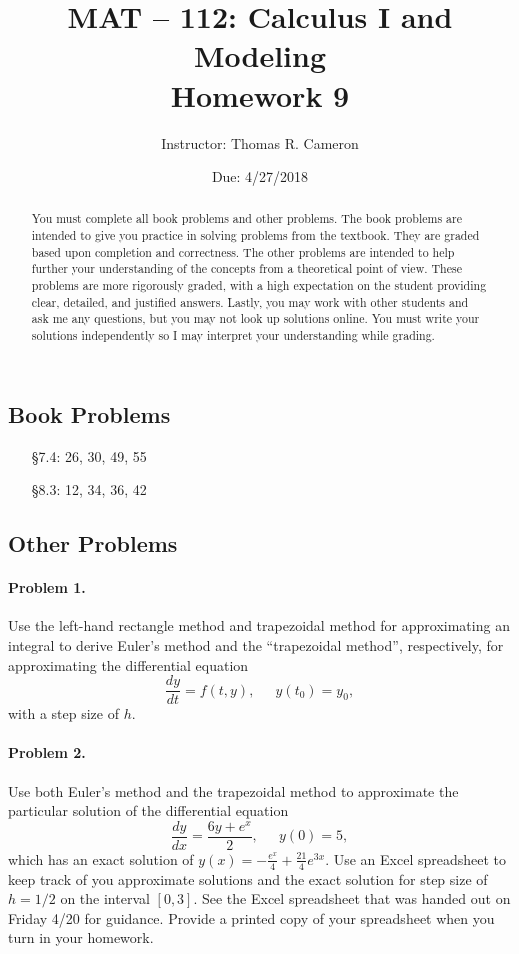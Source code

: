 \documentclass{article}
\title{MAT -- 112: Calculus I and Modeling\\
\large{Homework 9}}
\author{Instructor: Thomas R. Cameron}
\date{Due: 4/27/2018}
\begin{document}
\maketitle

\begin{abstract}
You must complete all book problems and other problems. The book problems are intended to give you practice in solving problems from the textbook. They are graded based upon completion and correctness. The other problems are intended to help further your understanding of the concepts from a theoretical point of view. These problems are more rigorously graded, with a high expectation on the student providing clear, detailed, and justified answers. Lastly, you may work with other students and ask me any questions, but you may not look up solutions online. You must write your solutions independently so I may interpret your understanding while grading. 
\end{abstract}

\subsection*{Book Problems}
\begin{itemize}
\item	  [\S 7.4:] 26, 30, 49, 55
\item	  [\S 8.3:] 12, 34, 36, 42
\end{itemize}

\subsection*{Other Problems}

\paragraph*{Problem 1.} Use the left-hand rectangle method and trapezoidal method for approximating an integral to derive Euler's method and the ``trapezoidal method'', respectively, for approximating the differential equation
\[
\frac{dy}{dt}=f(t,y),~\quad~y(t_{0})=y_{0},
\]
with a step size of $h$. 

\paragraph*{Problem 2.} Use both Euler's method and the trapezoidal method to approximate the particular solution of the differential equation
\[
\frac{dy}{dx}=\frac{6y+e^{x}}{2},~\quad~y(0)=5,
\]
which has an exact solution of $y(x)=-\frac{e^{x}}{4}+\frac{21}{4}e^{3x}$. Use an Excel spreadsheet to keep track of you approximate solutions and the exact solution for step size of $h=1/2$ on the interval $[0,3]$. See the Excel spreadsheet that was handed out on Friday 4/20 for guidance. Provide a printed copy of your spreadsheet when you turn in your homework. 
\end{document}
